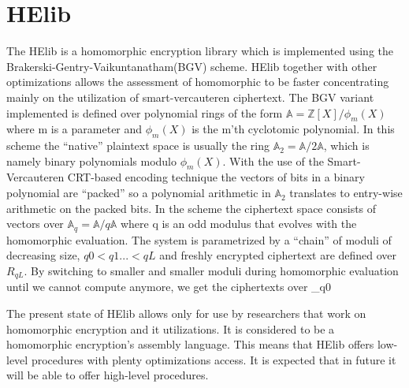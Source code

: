 \section{HElib}
The HElib is a homomorphic encryption library which is implemented using the Brakerski-Gentry-Vaikuntanatham(BGV) scheme. HElib together with other optimizations allows the assessment of homomorphic to be faster concentrating mainly on the utilization of smart-vercauteren ciphertext. The BGV variant implemented is defined over polynomial rings of the form $\mathbb{A} = \mathbb{Z}\left [ X \right ]/\phi _{m}(X)$ where m is a parameter and $\phi _{m}(X)$ is the m'th cyclotomic polynomial\cite{halevi2013design}. In this scheme the ``native'' plaintext space is usually the ring $\mathbb{A}_{2}=\mathbb{A}/2\mathbb{A}$, which is namely binary polynomials modulo $\phi _{m}(X)$. With the use of the Smart-Vercauteren CRT-based encoding technique the vectors of bits in a binary polynomial are ``packed'' so a polynomial arithmetic in $\mathbb{A}_{2}$ translates to entry-wise arithmetic on the packed bits. In the scheme the ciphertext space consists of vectors over $\mathbb{A}_{q} = \mathbb{A}/q\mathbb{A}$ where q is an odd modulus that evolves with the homomorphic evaluation. The system is parametrized by a ``chain'' of moduli of decreasing size, $q0<q1...<qL$ and freshly encrypted ciphertext are defined over $R_{qL}$\cite{halevi2013design}. By switching to smaller and smaller moduli during homomorphic evaluation until we cannot compute anymore, we get the ciphertexts over _{q0}

The present state of HElib allows only for use by researchers that work on homomorphic encryption and it utilizations. It is considered to be a homomorphic encryption’s assembly language. This means that HElib offers low-level procedures with plenty optimizations access. It is expected that in future it will be able to offer high-level procedures.

\newpage
